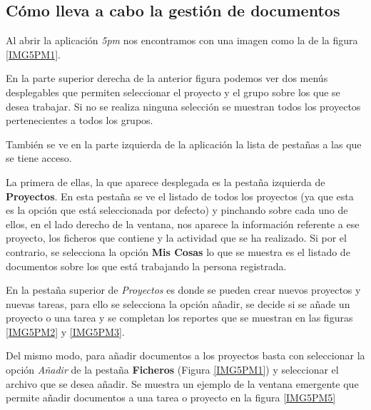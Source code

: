 \documentclass[11pt,a4paper,spanish,twoside]{report}
\begin{document}
	\subsection{Cómo lleva a cabo la gestión de documentos}
        
        Al abrir la aplicación \emph{5pm} nos encontramos con una imagen como
        la de la figura \ref{IMG5PM1}.
        

        En la parte superior derecha de la anterior figura podemos ver dos
        menús desplegables que permiten seleccionar el proyecto y el grupo
        sobre los que se desea trabajar. Si no se realiza ninguna selección
        se muestran todos los proyectos pertenecientes a todos los grupos.

        También se ve en la parte izquierda de la aplicación la lista de
        pestañas a las que se tiene acceso.

        La primera de ellas, la que aparece desplegada es la pestaña
        izquierda de \textbf{Proyectos}. En esta pestaña se ve el listado de
        todos los proyectos (ya que esta es la opción que está seleccionada
        por defecto) y pinchando sobre cada uno de ellos, en el lado derecho
        de la ventana, nos aparece la información referente a ese proyecto,
        los ficheros que contiene y la actividad que se ha realizado. Si por
        el contrario, se selecciona la opción \textbf{Mis Cosas} lo que se
        muestra es el listado de documentos sobre los que está trabajando la
        persona registrada.

        En la pestaña superior de \emph{Proyectos} es donde se pueden crear
        nuevos proyectos y nuevas tareas, para ello se selecciona la opción
        añadir, se decide si se añade un proyecto o una tarea y se completan
        los reportes que se muestran en las figuras \ref{IMG5PM2} y
        \ref{IMG5PM3}.

    
      
        Del mismo modo, para añadir documentos a los proyectos basta con
        seleccionar la opción \emph{Añadir} de la pestaña \textbf{Ficheros}
        (Figura \ref{IMG5PM1}) y seleccionar el archivo que se desea añadir.
        Se muestra un ejemplo de la ventana emergente que permite añadir
        documentos a una tarea o proyecto en la figura \ref{IMG5PM5}
\end{document}
